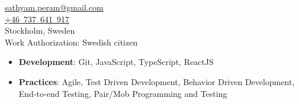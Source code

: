 
\begin{minipage}[t]{0.29\textwidth} %
\colorbox{cvblue!90}{\begin{minipage}[t][5mm][t]{\textwidth}\null\hfill\null\end{minipage}}

\vspace{-0.3ex} %
\colorbox{cvblue!90}
{\color{white}  %
    \textwidth\relax%

    \begin{minipage}[t][293mm][t]{0.82\textwidth}
    \raggedright
    \vspace*{2.5ex}




    \Large
    \vspace*{0.5ex} %
    \href{mailto:sathyam.peram@gmail.com}{\color{sidebarlinkcolor}sathyam.peram@gmail.com} \\
    \href{tel:+46737641917}{\color{sidebarlinkcolor}+46~737~641~917} \\
    Stockholm, Sweden \\
    \vspace{0.5em}
    Work Authorization: Swedish citizen

    \Large
    \Large
    \begin{itemize}
    \setlength{\itemsep}{0.2em}
        \item \textbf{Development}: Git, JavaScript, TypeScript, ReactJS
        \item \textbf{Practices}: Agile, Test Driven Development, Behavior Driven Development, End-to-end Testing, Pair/Mob Programming and Testing
    \end{itemize}


\end{minipage}}
\end{minipage}
